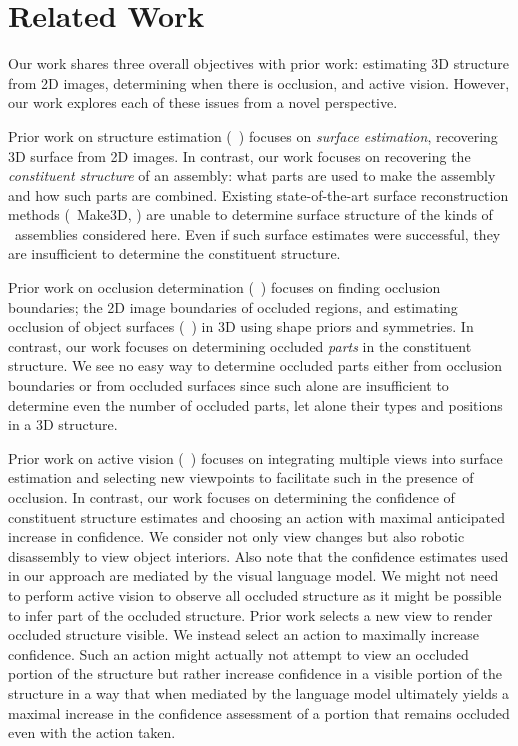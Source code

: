 \par\vspace{-1ex}
\section{Related Work}
\label{sec:related}

Our work shares three overall objectives with prior work:
estimating 3D structure from 2D images, determining when there is
occlusion, and active vision.
%
However, our work explores each of these issues from a novel perspective.

Prior work on structure estimation (\eg\ )
focuses on \emph{surface estimation}, recovering 3D surface from 2D images.
%
In contrast, our work focuses on recovering the \emph{constituent structure}
of an assembly: what parts are used to make the assembly and how such parts are
combined.
%
Existing state-of-the-art surface reconstruction methods (\eg\ Make3D,
 ) are unable to determine surface structure of the kinds of
\LincolnLog\ assemblies considered here.
%
Even if such surface estimates were successful, they are insufficient to
determine the constituent structure.

Prior work on occlusion determination (\eg\ )
focuses on finding occlusion boundaries; the 2D image boundaries of occluded
regions, and estimating occlusion of object surfaces (\eg\
) in $3$D using shape priors and symmetries.
%
In contrast, our work focuses on determining occluded \emph{parts} in the
constituent structure.
%
We see no easy way to determine occluded parts either from occlusion boundaries
or from occluded surfaces since such alone are insufficient to determine even
the number of occluded parts, let alone their types and positions in a 3D
structure.

Prior work on active vision (\eg\ ) focuses on integrating
multiple views into surface estimation and selecting new viewpoints to
facilitate such in the presence of occlusion.
%
In contrast, our work focuses on determining the confidence of constituent
structure estimates and choosing an action with maximal anticipated increase in
confidence.
%
We consider not only view changes but also robotic disassembly to view object
interiors.
%
Also note that the confidence estimates used in our approach are mediated by
the visual language model.
%
We might not need to perform active vision to observe all occluded structure as
it might be possible to infer part of the occluded structure.
%
Prior work selects a new view to render occluded structure visible.
%
We instead select an action to maximally increase confidence.
%
Such an action might actually not attempt to view an occluded portion of the
structure but rather increase confidence in a visible portion of the structure
in a way that when mediated by the language model ultimately yields a maximal
increase in the confidence assessment of a portion that remains occluded even
with the action taken.

